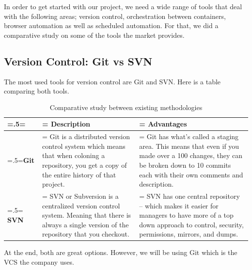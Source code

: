 In order to get started with our project, we need a wide range of tools that deal with the following areas; version control, orchestration between containers, browser automation as well as scheduled automation. For that, we did a comparative study on some of the tools the market provides.

\subsection{Version Control: Git vs SVN}
The most used tools for version control are Git and SVN. Here is a table comparing both tools.
\begin{table}[H]
	\renewcommand{\arraystretch}{1.5}%
	\caption{Comparative study between existing methodologies}
	\centering
	\medskip
	\begin{tabularx}{1\textwidth} {
			| >{\hsize=.5\hsize\linewidth=\hsize\centering\arraybackslash}X
			| >{\hsize=1.25\hsize\linewidth=\hsize\centering\arraybackslash}X
			| >{\hsize=1.25\hsize\linewidth=\hsize\centering\arraybackslash}X |}
		\hline
		\rowcolor{primary} & \textbf {Description}                                                                                                                          & \textbf {Advantages}                                                                                                                                                           \\
		\hline
		\textbf{Git}       & Git is a distributed version control system which means that when coloning a repository, you get a copy of the entire history of that project. & Git has what's called a staging area. This means that even if you made over a 100 changes, they can be broken down to 10 commits each with their own comments and description. \\
		\hline
		\textbf{SVN}       & SVN or Subversion is a centralized version control system. Meaning that there is always a single version of the repository that you checkout.  & SVN has one central repository – which makes it easier for managers to have more of a top down approach to control, security, permissions, mirrors, and dumps.                 \\
		\hline
	\end{tabularx}
\end{table}
At the end, both are great options. However, we will be using Git which is the VCS the company uses.

